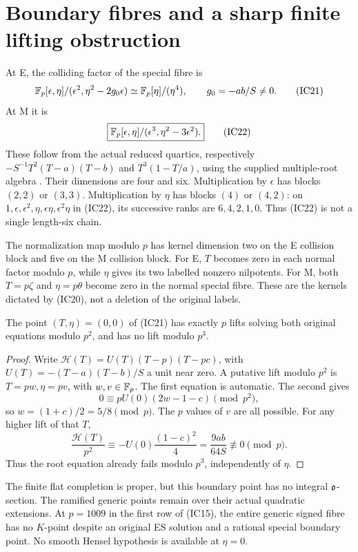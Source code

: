 \section{Boundary fibres and a sharp finite lifting obstruction}
At E, the colliding factor of the special fibre is
\[
 \mathbb F_p[\epsilon,\eta]/(\epsilon^2,\eta^2-2g_0\epsilon)
 \simeq\mathbb F_p[\eta]/(\eta^4),\qquad g_0=-ab/S\ne0.         \tag{IC21}
\]
At M it is
\[
 \boxed{\mathbb F_p[\epsilon,\eta]/(\epsilon^3,\eta^2-3\epsilon^2).} \tag{IC22}
\]
These follow from the actual reduced quartics, respectively
$-S^{-1}T^2(T-a)(T-b)$ and $T^3(1-T/a)$, using the supplied
multiple-root algebra \cite[equation (23)]{Input}. Their dimensions are four
and six. Multiplication by $\epsilon$ has blocks $(2,2)$ or $(3,3)$.
Multiplication by $\eta$ has blocks $(4)$ or $(4,2)$: on
$1,\epsilon,\epsilon^2,\eta,\epsilon\eta,\epsilon^2\eta$ in (IC22), its
successive ranks are $6,4,2,1,0$. Thus (IC22) is not a single length-six chain.

The normalization map modulo $p$ has kernel dimension two on the E collision
block and five on the M collision block. For E, $T$ becomes zero in each normal
factor modulo $p$, while $\eta$ gives its two labelled nonzero nilpotents. For M,
both $T=p\zeta$ and $\eta=p\theta$ become zero in the normal special fibre.
These are the kernels dictated by (IC20), not a deletion of the original labels.

\begin{theorem}\label{thm:lift}
The point $(T,\eta)=(0,0)$ of (IC21) has exactly $p$ lifts solving both original
equations modulo $p^2$, and has no lift modulo $p^3$.
\end{theorem}
\begin{proof}
Write $\mathcal H(T)=U(T)(T-p)(T-pc)$, with
$U(T)=-(T-a)(T-b)/S$ a unit near zero. A putative lift modulo $p^2$ is
$T=pw,\eta=pv$, with $w,v\in\mathbb F_p$. The first equation is automatic. The
second gives
\[
 0\equiv pU(0)(2w-1-c)\pmod{p^2},
\]
so $w=(1+c)/2=5/8\pmod p$. The $p$ values of $v$ are all possible.
For any higher lift of that $T$,
\[
 \frac{\mathcal H(T)}{p^2}\equiv
 -U(0)\frac{(1-c)^2}{4}
 =\frac{9ab}{64S}\not\equiv0\pmod p.                   \tag{IC23}
\]
Thus the root equation already fails modulo $p^3$, independently of $\eta$.
\end{proof}

The finite flat completion is proper, but this boundary point has no integral
$\mathfrak o$-section. The ramified generic points remain over their actual quadratic
extensions. At $p=1009$ in the first row of (IC15), the entire generic signed
fibre has no $K$-point despite an original ES solution and a rational special
boundary point. No smooth Hensel hypothesis is available at $\eta=0$.

